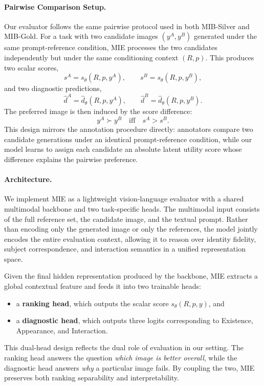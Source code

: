 \documentclass{article}
\begin{document}
\paragraph{Pairwise Comparison Setup.}
Our evaluator follows the same pairwise protocol used in both MIB-Silver and MIB-Gold. For a task with two candidate images $(y^A, y^B)$ generated under the same prompt-reference condition, MIE processes the two candidates independently but under the same conditioning context $(R,p)$. This produces two scalar scores,
\[
s^A = s_\theta(R,p,y^A), \qquad s^B = s_\theta(R,p,y^B),
\]
and two diagnostic predictions,
\[
\hat d^A = \hat d_\theta(R,p,y^A), \qquad \hat d^B = \hat d_\theta(R,p,y^B).
\]
The preferred image is then induced by the score difference:
\[
y^A \succ y^B \quad \text{iff} \quad s^A > s^B.
\]
This design mirrors the annotation procedure directly: annotators compare two candidate generations under an identical prompt-reference condition, while our model learns to assign each candidate an absolute latent utility score whose difference explains the pairwise preference.

\paragraph{Architecture.}
We implement MIE as a lightweight vision-language evaluator with a shared multimodal backbone and two task-specific heads. The multimodal input consists of the full reference set, the candidate image, and the textual prompt. Rather than encoding only the generated image or only the references, the model jointly encodes the entire evaluation context, allowing it to reason over identity fidelity, subject correspondence, and interaction semantics in a unified representation space.

Given the final hidden representation produced by the backbone, MIE extracts a global contextual feature and feeds it into two trainable heads:
\begin{itemize}
    \item a \textbf{ranking head}, which outputs the scalar score $s_\theta(R,p,y)$, and
    \item a \textbf{diagnostic head}, which outputs three logits corresponding to Existence, Appearance, and Interaction.
\end{itemize}

This dual-head design reflects the dual role of evaluation in our setting. The ranking head answers the question \emph{which image is better overall}, while the diagnostic head answers \emph{why} a particular image fails. By coupling the two, MIE preserves both ranking separability and interpretability.
\end{document}
